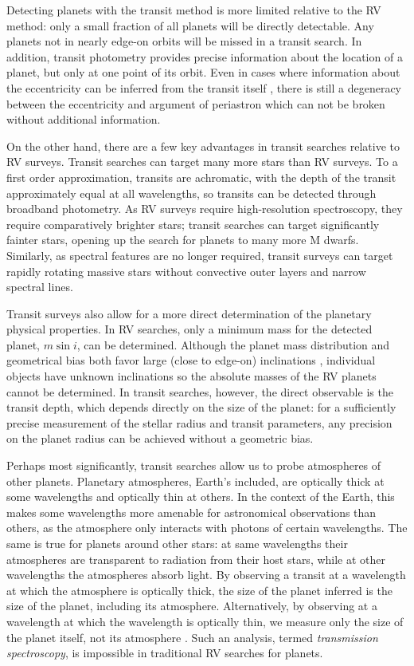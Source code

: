\documentclass[12pt]{caltech_thesis}
\begin{document}
Detecting planets with the transit method is more limited relative to the RV method:
only a small fraction of all planets will be directly detectable. 
Any planets not in nearly edge-on orbits will be missed in a transit search.
In addition, transit photometry provides precise information about the location 
of a planet, but only at one point of its orbit.
Even in cases where information about the eccentricity can be inferred from the
transit itself \citep{Dawson12a}, there is still a degeneracy
between the eccentricity and argument of periastron which can not be broken without
additional information.

On the other hand, there are a few key advantages in transit searches relative to 
RV surveys. 
Transit searches can target many more stars than RV surveys. 
To a first order approximation, transits are achromatic, with the depth of the transit
approximately equal at all wavelengths, so transits can be detected through broadband
photometry.
As RV surveys require high-resolution spectroscopy, they require comparatively brighter
stars; transit searches can target significantly fainter stars, opening up the search
for planets to many more M dwarfs.
Similarly, as spectral features are no longer required, transit surveys can target 
rapidly rotating massive stars without convective outer layers and narrow spectral lines.

Transit surveys also allow for a more direct determination of the planetary physical 
properties. 
In RV searches, only a minimum mass
for the detected planet, $m \sin i$, can be determined. 
Although the planet mass distribution and geometrical bias both favor large
(close to edge-on) inclinations \citep{Ho11}, individual objects have unknown inclinations
so the absolute masses of the RV planets cannot be determined.
In transit searches, however, the direct observable is the transit depth, which depends
directly on the size of the planet: for a sufficiently precise measurement of the stellar
radius and transit parameters, any precision on the planet radius can be achieved without
a geometric bias.

Perhaps most significantly, transit searches allow us to probe atmospheres of
other planets.
Planetary atmospheres, Earth's included, are optically thick at some wavelengths and
optically thin at others. 
In the context of the Earth, this makes some wavelengths more amenable for astronomical
observations than others, as the atmosphere only interacts with photons of certain
wavelengths.
The same is true for planets around other stars: at same wavelengths their atmospheres
are transparent to radiation from their host stars, while at other wavelengths
the atmospheres absorb light.
By observing a transit at a wavelength at which the atmosphere is optically thick, the
size of the planet inferred is the size of the planet, including its atmosphere.
Alternatively, by observing at a wavelength at which the wavelength is optically thin,
we measure only the size of the planet itself, not its atmosphere \citep[e.g.][]{Knutson11, Knutson14}. 
Such an analysis, termed \textit{transmission spectroscopy}, is impossible in traditional RV searches for planets.
\end{document}
